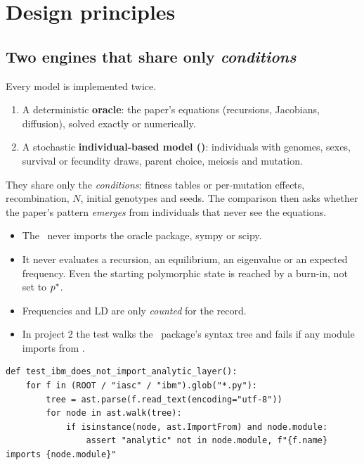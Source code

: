 \chapter{Design principles}\label{ch:design}

\section{Two engines that share only \emph{conditions}}
Every model is implemented twice.
\begin{enumerate}
\item A deterministic \textbf{oracle}: the paper's equations (recursions, Jacobians, diffusion), solved exactly or numerically.
\item A stochastic \textbf{individual-based model (\IBM)}: individuals with genomes, sexes, survival or fecundity draws, parent choice, meiosis and mutation.
\end{enumerate}
They share only the \emph{conditions}: fitness tables or per-mutation effects, recombination, $N$, initial genotypes and seeds. The comparison then asks whether the paper's pattern \emph{emerges} from individuals that never see the equations.

\begin{keybox}
\begin{itemize}
\item The \IBM\ never imports the oracle package, sympy or scipy.
\item It never evaluates a recursion, an equilibrium, an eigenvalue or an expected frequency. Even the starting polymorphic state is reached by a burn-in, not set to $p^{*}$.
\item Frequencies and LD are only \emph{counted} for the record.
\item In project 2 the test walks the \IBM\ package's syntax tree and fails if any module imports from .
\end{itemize}
\end{keybox}
\begin{lstlisting}
def test_ibm_does_not_import_analytic_layer():
    for f in (ROOT / "iasc" / "ibm").glob("*.py"):
        tree = ast.parse(f.read_text(encoding="utf-8"))
        for node in ast.walk(tree):
            if isinstance(node, ast.ImportFrom) and node.module:
                assert "analytic" not in node.module, f"{f.name} imports {node.module}"
\end{lstlisting}

